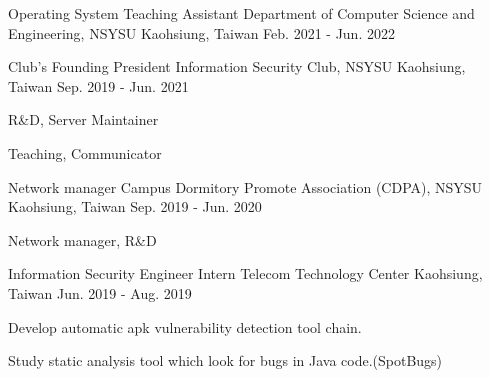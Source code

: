 
\begin{cventries}
  \cventry
  {Operating System Teaching Assistant} %
  {Department of Computer Science and Engineering, NSYSU} %
  {Kaohsiung, Taiwan} %
  {Feb. 2021 - Jun. 2022} %
  {}

  \cventry
  {Club's Founding President} %
  {Information Security Club, NSYSU} %
  {Kaohsiung, Taiwan} %
  {Sep. 2019 - Jun. 2021} %
  {
    \begin{cvitems} %
      \item {R\&D, Server Maintainer}
      \item {Teaching, Communicator}
    \end{cvitems}
  }

  \cventry
  {Network manager} %
  {Campus Dormitory Promote Association (CDPA), NSYSU} %
  {Kaohsiung, Taiwan} %
  {Sep. 2019 - Jun. 2020} %
  {
    \begin{cvitems} %
      \item {Network manager, R\&D}
    \end{cvitems}
  }

  \cventry
  {Information Security Engineer Intern} %
  {Telecom Technology Center} %
  {Kaohsiung, Taiwan} %
  {Jun. 2019 - Aug. 2019} %
  {
    \begin{cvitems} %
      \item {Develop automatic apk vulnerability detection tool chain.}
      \item {Study static analysis tool which look for bugs in Java code.(SpotBugs)}
    \end{cvitems}
  }


\end{cventries}
